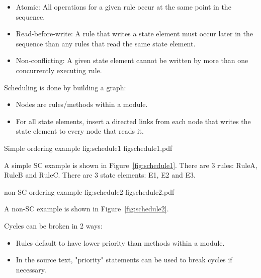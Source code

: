 \begin{itemize}
\item Atomic: All operations for a given rule occur at the same point in the sequence.
\item Read-before-write:  A rule that writes a state element must occur later in the sequence
than any rules that read the same state element.
\item Non-conflicting: A given state element cannot be written by more than one concurrently executing rule.
\end{itemize}

Scheduling is done by building a graph:
\begin{itemize}
\item Nodes are rules/methods within a module.
\item For all state elements, insert a directed links from each node that writes the state element to every node that reads it.
\end{itemize}

\begin{importgraphic}
{Simple ordering example}
{fig:schedule1}
{figschedule1.pdf}
\end{importgraphic}
A simple SC example is shown in Figure~\ref{fig:schedule1}.  There are 3 rules: RuleA, RuleB and RuleC.  There are 3 state elements: E1, E2 and E3.

\begin{importgraphic}
{non-SC ordering example}
{fig:schedule2}
{figschedule2.pdf}
\end{importgraphic}
A non-SC example is shown in Figure~\ref{fig:schedule2}.

Cycles can be broken in 2 ways:
\begin{itemize}
\item Rules default to have lower priority than methods within a module.
\item In the source text, "priority" statements can be used to break cycles if necessary.
\end{itemize}


